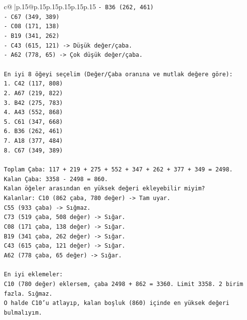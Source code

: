 \documentclass{article}
\begin{document}
{\begin{supertabular}{c@{$\;$}|p{.15\linewidth}@{}p{.15\linewidth}p{.15\linewidth}p{.15\linewidth}p{.15\linewidth}p{.15\linewidth}}
{{{\texttt{{-} B36 (262, 461)} \\
\texttt{{-} C67 (349, 389)} \\
\texttt{{-} C08 (171, 138)} \\
\texttt{{-} B19 (341, 262)} \\
\texttt{{-} C43 (615, 121) {-}> Düşük değer/çaba.} \\
\texttt{{-} A62 (778, 65) {-}> Çok düşük değer/çaba.} \\
\\ 
\texttt{En iyi 8 öğeyi seçelim (Değer/Çaba oranına ve mutlak değere göre):} \\
\texttt{1. C42 (117, 808)} \\
\texttt{2. A67 (219, 822)} \\
\texttt{3. B42 (275, 783)} \\
\texttt{4. A43 (552, 868)} \\
\texttt{5. C61 (347, 668)} \\
\texttt{6. B36 (262, 461)} \\
\texttt{7. A18 (377, 484)} \\
\texttt{8. C67 (349, 389)} \\
\\ 
\texttt{Toplam Çaba: 117 + 219 + 275 + 552 + 347 + 262 + 377 + 349 = 2498.} \\
\texttt{Kalan Çaba: 3358 {-} 2498 = 860.} \\
\texttt{Kalan öğeler arasından en yüksek değeri ekleyebilir miyim?} \\
\texttt{Kalanlar: C10 (862 çaba, 780 değer) {-}> Tam uyar.} \\
\texttt{C55 (933 çaba) {-}> Sığmaz.} \\
\texttt{C73 (519 çaba, 508 değer) {-}> Sığar.} \\
\texttt{C08 (171 çaba, 138 değer) {-}> Sığar.} \\
\texttt{B19 (341 çaba, 262 değer) {-}> Sığar.} \\
\texttt{C43 (615 çaba, 121 değer) {-}> Sığar.} \\
\texttt{A62 (778 çaba, 65 değer) {-}> Sığar.} \\
\\ 
\texttt{En iyi eklemeler:} \\
\texttt{C10 (780 değer) eklersem, çaba 2498 + 862 = 3360. Limit 3358. 2 birim fazla. Sığmaz.} \\
\texttt{O halde C10'u atlayıp, kalan boşluk (860) içinde en yüksek değeri bulmalıyım.} \\
\\ 
}}}
\end{supertabular}}
\end{document}
